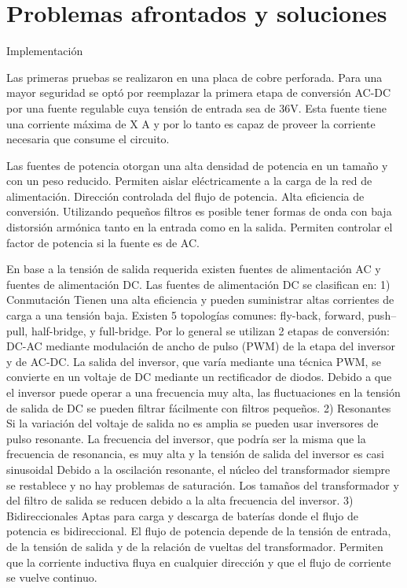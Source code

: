 \section{Problemas afrontados y soluciones}
Implementación

Las primeras pruebas se realizaron en una placa de cobre perforada. 
Para una mayor seguridad se optó por reemplazar la primera etapa de conversión AC-DC por una fuente regulable cuya tensión de entrada sea de 36V.
Esta fuente tiene una corriente máxima de X A y por lo tanto es capaz de proveer la corriente necesaria que consume el circuito. 

Las fuentes de potencia otorgan una alta densidad de potencia en un tamaño y con un peso reducido.  
Permiten aislar eléctricamente a la carga de la red de alimentación. 
Dirección controlada del flujo de potencia. 
Alta eficiencia de conversión. 
Utilizando pequeños filtros es posible tener formas de onda con baja distorsión armónica tanto en la entrada como en la salida. 
Permiten controlar el factor de potencia si la fuente es de AC. 



En base a la tensión de salida requerida existen fuentes de alimentación AC y fuentes de alimentación DC.
Las fuentes de alimentación DC se clasifican en:
1) Conmutación
Tienen una alta eficiencia y pueden suministrar altas corrientes de carga a una tensión baja.
Existen 5 topologías comunes: fly-back, forward, push–pull, half-bridge, y full-bridge.
Por lo general se utilizan 2 etapas de conversión: DC-AC mediante modulación de ancho de pulso (PWM) de la etapa del inversor y de AC-DC.
La salida del inversor, que varía mediante una técnica PWM, se convierte en un voltaje de DC mediante un rectificador de diodos. 
Debido a que el inversor puede operar a una frecuencia muy alta, las fluctuaciones en la tensión de salida de DC se pueden filtrar fácilmente con filtros pequeños. 
2) Resonantes
Si la variación del voltaje de salida no es amplia se pueden usar inversores de pulso resonante. 
La frecuencia del inversor, que podría ser la misma que la frecuencia de resonancia, es muy alta y la tensión de salida del inversor es casi sinusoidal 
Debido a la oscilación resonante, el núcleo del transformador siempre se restablece y no hay problemas de saturación. 
Los tamaños del transformador y del filtro de salida se reducen debido a la alta frecuencia del inversor.
3) Bidireccionales 
Aptas para carga y descarga de baterías donde el flujo de potencia es bidireccional. 
El flujo de potencia depende de la tensión de entrada, de la tensión de salida y de la relación de vueltas del transformador. 
Permiten que la corriente inductiva fluya en cualquier dirección y que el flujo de corriente se vuelve continuo.

